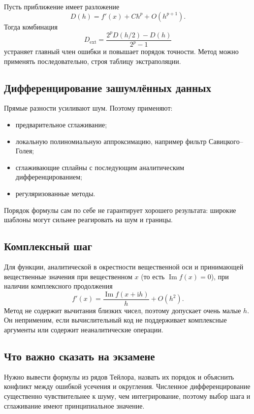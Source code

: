 Пусть приближение имеет разложение
\[
    D(h)=f'(x)+Ch^p+O(h^{p+1}).
\]
Тогда комбинация
\[
    D_{\mathrm{ext}}=
    \frac{2^pD(h/2)-D(h)}{2^p-1}
\]
устраняет главный член ошибки и повышает порядок точности. Метод можно применять
последовательно, строя таблицу экстраполяции.

\subsection{Дифференцирование зашумлённых данных}

Прямые разности усиливают шум. Поэтому применяют:
\begin{itemize}
    \item предварительное сглаживание;
    \item локальную полиномиальную аппроксимацию, например фильтр
          Савицкого--Голея;
    \item сглаживающие сплайны с последующим аналитическим дифференцированием;
    \item регуляризованные методы.
\end{itemize}
Порядок формулы сам по себе не гарантирует хорошего результата: широкие шаблоны
могут сильнее реагировать на шум и границы.

\subsection{Комплексный шаг}

Для функции, аналитической в окрестности вещественной оси и принимающей
вещественные значения при вещественном $x$ (то есть $\operatorname{Im}f(x)=0$),
при наличии комплексного продолжения
\[
    f'(x)=\frac{\operatorname{Im}f(x+\mathrm{i}h)}{h}+O(h^2).
\]
Метод не содержит вычитания близких чисел, поэтому допускает очень малые $h$.
Он неприменим, если вычислительный код не поддерживает комплексные аргументы или
содержит неаналитические операции.

\subsection{Что важно сказать на экзамене}

Нужно вывести формулы из рядов Тейлора, назвать их порядок и объяснить конфликт
между ошибкой усечения и округления. Численное дифференцирование существенно
чувствительнее к шуму, чем интегрирование, поэтому выбор шага и сглаживание имеют
принципиальное значение.

\newpage